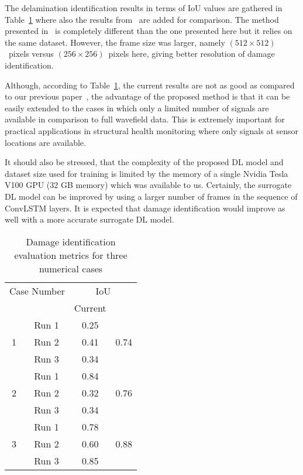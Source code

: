 \documentclass[pdflatex,sn-mathphys-num]{sn-jnl}%
\begin{document}
	The delamination identification results in terms of IoU values are gathered 
	in Table~\ref{tab:iou} where also the results from~\cite{Ullah2023} are 
	added for comparison.
	The method presented in~\cite{Ullah2023} is completely different than the 
	one presented here but it relies on the same dataset.
	However, the frame size was larger, namely \((512\times512)\)~pixels versus 
	\((256\times256)\)~pixels here, giving better resolution of damage 
	identification.
	
	Although, according to Table~\ref{tab:iou}, the current results are not as 
	good as compared to our previous paper~\cite{Ullah2023}, the advantage of 
	the proposed method is that it can be easily extended to the cases in which 
	only a limited number of signals are available in comparison to full 
	wavefield data.
	This is extremely important for practical applications in structural health 
	monitoring where only signals at sensor locations are available.
	
	It should also be stressed, that the complexity of the proposed DL model 
	and dataset size used for training is limited by the memory of a single 
	Nvidia Tesla V100 GPU (32 GB memory) which was available to us.
	Certainly, the surrogate DL model can be improved by using a larger number 
	of frames in the sequence of ConvLSTM layers. 
	It is expected that damage identification would improve as well with a more 
	accurate surrogate DL model.
	
\begin{table}[ht]
	\caption{Damage identification evaluation metrics for three numerical cases}
	\label{tab:iou}
	\begin{tabular*}{\textwidth}{@{\extracolsep{\fill}}cccc}
		\toprule
		\multicolumn{2}{c}{Case Number} & \multicolumn{2}{c}{IoU} \\ 
		\cmidrule(lr){3-4} 
		& & Current & \cite{Ullah2023}\\
		\midrule
		\multirow{3}{*}{1} & Run 1 & 0.25 & \multirow{3}{*}{0.74} \\ 
		& Run 2 & 0.41 & \\ 
		& Run 3 & 0.34 & \\ 
		\midrule
		\multirow{3}{*}{2} & Run 1 & 0.84 & \multirow{3}{*}{0.76} \\ 
		& Run 2 & 0.32 & \\ 
		& Run 3 & 0.34 & \\ 
		\midrule
		\multirow{3}{*}{3} & Run 1 & 0.78 & \multirow{3}{*}{0.88} \\ 
		& Run 2 & 0.60 & \\ 
		& Run 3 & 0.85 & \\ 
		\bottomrule
	\end{tabular*}
\end{table}
\end{document}
